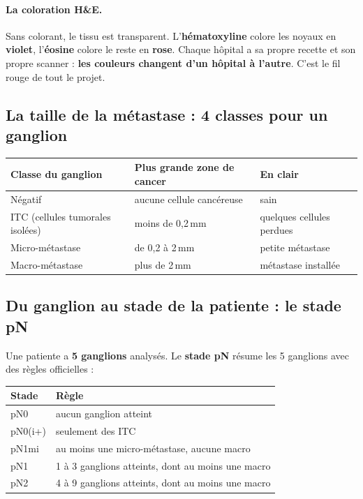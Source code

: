 \documentclass[11pt,a4paper]{article}
\begin{document}
\paragraph{La coloration H\&E.} Sans colorant, le tissu est transparent. L'\textbf{hématoxyline} colore les noyaux en
\textbf{violet}, l'\textbf{éosine} colore le reste en \textbf{rose}. Chaque hôpital a sa propre recette et son propre scanner :
\textbf{les couleurs changent d'un hôpital à l'autre}. C'est le fil rouge de tout le projet.

\subsection{La taille de la métastase : 4 classes pour un ganglion}
\begin{table}[H]
\centering
\begin{tabular}{lll}
\toprule
\textbf{Classe du ganglion} & \textbf{Plus grande zone de cancer} & \textbf{En clair} \\
\midrule
Négatif & aucune cellule cancéreuse & sain \\
ITC (cellules tumorales isolées) & moins de 0,2\,mm & quelques cellules perdues \\
Micro-métastase & de 0,2 à 2\,mm & petite métastase \\
Macro-métastase & plus de 2\,mm & métastase installée \\
\bottomrule
\end{tabular}
\end{table}

\subsection{Du ganglion au stade de la patiente : le stade pN}
Une patiente a \textbf{5 ganglions} analysés. Le \textbf{stade pN} résume les 5 ganglions avec des règles officielles :
\begin{table}[H]
\centering
\begin{tabular}{ll}
\toprule
\textbf{Stade} & \textbf{Règle} \\
\midrule
pN0 & aucun ganglion atteint \\
pN0(i+) & seulement des ITC \\
pN1mi & au moins une micro-métastase, aucune macro \\
pN1 & 1 à 3 ganglions atteints, dont au moins une macro \\
pN2 & 4 à 9 ganglions atteints, dont au moins une macro \\
\bottomrule
\end{tabular}
\end{table}
\end{document}
